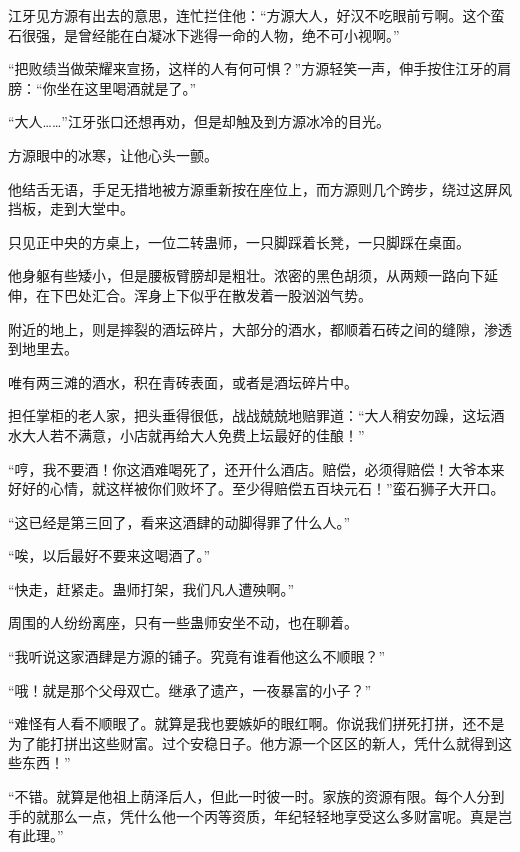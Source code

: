 
\begin{this_body}



江牙见方源有出去的意思，连忙拦住他：“方源大人，好汉不吃眼前亏啊。这个蛮石很强，是曾经能在白凝冰下逃得一命的人物，绝不可小视啊。”

“把败绩当做荣耀来宣扬，这样的人有何可惧？”方源轻笑一声，伸手按住江牙的肩膀：“你坐在这里喝酒就是了。”

“大人……”江牙张口还想再劝，但是却触及到方源冰冷的目光。

方源眼中的冰寒，让他心头一颤。

他结舌无语，手足无措地被方源重新按在座位上，而方源则几个跨步，绕过这屏风挡板，走到大堂中。

只见正中央的方桌上，一位二转蛊师，一只脚踩着长凳，一只脚踩在桌面。

他身躯有些矮小，但是腰板臂膀却是粗壮。浓密的黑色胡须，从两颊一路向下延伸，在下巴处汇合。浑身上下似乎在散发着一股汹汹气势。

附近的地上，则是摔裂的酒坛碎片，大部分的酒水，都顺着石砖之间的缝隙，渗透到地里去。

唯有两三滩的酒水，积在青砖表面，或者是酒坛碎片中。

担任掌柜的老人家，把头垂得很低，战战兢兢地赔罪道：“大人稍安勿躁，这坛酒水大人若不满意，小店就再给大人免费上坛最好的佳酿！”

“哼，我不要酒！你这酒难喝死了，还开什么酒店。赔偿，必须得赔偿！大爷本来好好的心情，就这样被你们败坏了。至少得赔偿五百块元石！”蛮石狮子大开口。

“这已经是第三回了，看来这酒肆的动脚得罪了什么人。”

“唉，以后最好不要来这喝酒了。”

“快走，赶紧走。蛊师打架，我们凡人遭殃啊。”

周围的人纷纷离座，只有一些蛊师安坐不动，也在聊着。

“我听说这家酒肆是方源的铺子。究竟有谁看他这么不顺眼？”

“哦！就是那个父母双亡。继承了遗产，一夜暴富的小子？”

“难怪有人看不顺眼了。就算是我也要嫉妒的眼红啊。你说我们拼死打拼，还不是为了能打拼出这些财富。过个安稳日子。他方源一个区区的新人，凭什么就得到这些东西！”

“不错。就算是他祖上荫泽后人，但此一时彼一时。家族的资源有限。每个人分到手的就那么一点，凭什么他一个丙等资质，年纪轻轻地享受这么多财富呢。真是岂有此理。”


\end{this_body}
